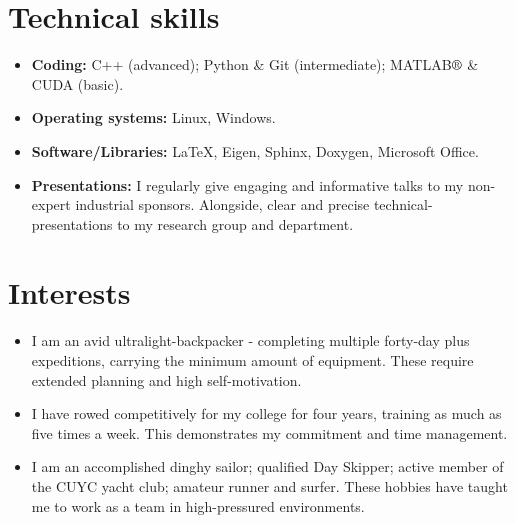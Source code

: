 \documentclass[11pt]{article}
\begin{document}
\section*{Technical skills}
\begin{itemize}[leftmargin=*]
    \setlength{\itemsep}{0pt}
    \item \textbf{Coding:} C++ (advanced); Python \&  Git (intermediate); MATLAB$\text{\textregistered}$ \& CUDA (basic).
    \item \textbf{Operating systems:} Linux, Windows.
    \item \textbf{Software/Libraries:} \LaTeX, Eigen, Sphinx, Doxygen, Microsoft Office.
    \item \textbf{Presentations:} I regularly give engaging and informative talks to my non-expert industrial sponsors. Alongside, clear and precise technical-presentations to my research group and department.
          
\end{itemize}

\section*{Interests}

\begin{itemize}[leftmargin=*]
    \setlength{\itemsep}{0pt}
    \item I am an avid ultralight-backpacker - completing multiple forty-day plus expeditions, carrying the minimum amount of equipment. These require extended planning and high self-motivation.
          
    \item I have rowed competitively for my college for four years, training as much as five times a week. This demonstrates my commitment and time management.
          
    \item I am an accomplished dinghy sailor; qualified Day Skipper; active member of the CUYC yacht club; amateur runner and surfer. These hobbies have taught me to work as a team in high-pressured environments.
\end{itemize}




\end{document}
